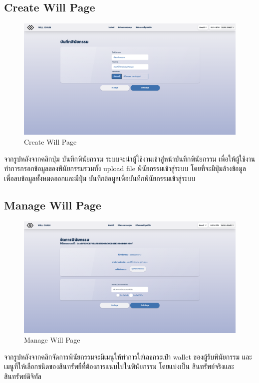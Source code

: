 \documentclass[12pt,oneside,openright,a4paper]{cpe-thai-project}
\begin{document}
\subsection{Create Will Page }
	\begin{figure}[!thb]
			\centering
			\includegraphics[scale=0.2]{mintWill4}
			\caption{Create Will Page}
		\end{figure}
		\FloatBarrier
\tab จากรูปหลังจากคลิกปุ่ม บันทึกพินัยกรรม ระบบจะนำผู้ใช้งานเข้าสู่หน้าบันทึกพินัยกรรม เพื่อให้ผู้ใช้งานทำการกรอกข้อมูลของพินัยกรรมรวมทั้ง upload file พินัยกรรมเข้าสู่ระบบ โดยที่จะมีปุ่มล้างข้อมูลเพื่อลบข้อมูลทั้งหมดออกและมีปุ่ม บันทึกข้อมูลเพื่อบันทึกพินัยกรรมเข้าสู่ระบบ

\subsection{Manage Will Page}
	\begin{figure}[!thb]
			\centering
			\includegraphics[scale=0.2]{manageWill4}
			\caption{Manage Will Page}
		\end{figure}
		\FloatBarrier
\tab จากรูปหลังจากคลิกจัดการพินัยกรรมจะมีเมนูให้ทำการใส่เลขกระเป๋า wallet ของผู้รับพินัยกรรม และ เมนูที่ให้เลือกชนิดของสินทรัพยืที่ต้องการแนบไปในพินัยกรรม โดยแบ่งเป็น สินทรัพย์จริงและสินทรัพย์ดิจิทัล 
\end{document}
